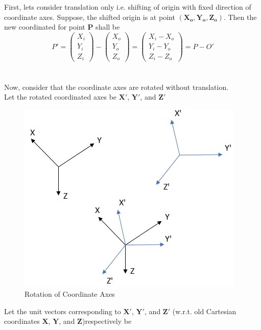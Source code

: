 \documentclass[a4paper,11pt,openany]{book}
\begin{document}
First, lets consider translation only i.e. shifting of origin with fixed direction of coordinate axes. Suppose, the shifted origin is at point $(\boldsymbol{X_o},\boldsymbol{Y_o},\boldsymbol{Z_o})$.
Then the new coordinated for point $\boldsymbol{P}$ shall be 
\begin{equation}
P' = 
\left(\begin{array}{c} X_i \\ Y_i \\ Z_i\end{array}\right) - \left(\begin{array}{c} X_o \\ Y_o \\ Z_o\end{array}\right)
= \left(\begin{array}{c} X_i-X_o \\ Y_i-Y_o \\ Z_i-Z_o\end{array}\right) = P - O'
\end{equation}
\\
\\Now, consider that the coordinate axes are rotated without translation.\\ Let the rotated coordinated axes be $\boldsymbol{X'}$, $\boldsymbol{Y'}$, and $\boldsymbol{Z'}$\\
\begin{figure}
\centering
\includegraphics[scale=0.6]{rotation}
\caption{Rotation of Coordinate Axes}
\end{figure}
Let the unit vectors corresponding to $\boldsymbol{X'}$, $\boldsymbol{Y'}$, and $\boldsymbol{Z'}$ (w.r.t. old Cartesian coordinates $\boldsymbol{X}$, $\boldsymbol{Y}$, and $\boldsymbol{Z}$)respectively be 
\end{document}
